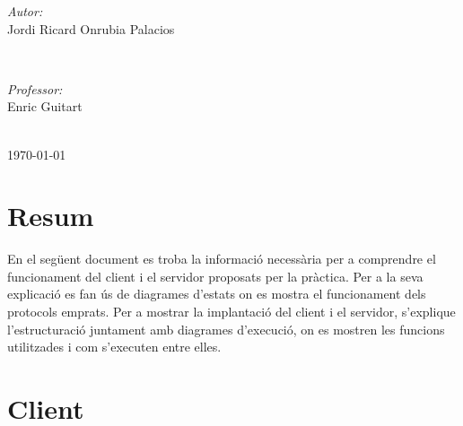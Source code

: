 \documentclass[11pt]{article}
\begin{document}
\begin{titlepage}
\begin{minipage}{0.4\textwidth}
\begin{flushleft} \large
\emph{Autor:}\\
Jordi Ricard Onrubia Palacios %
\end{flushleft}
\end{minipage}
~
\begin{minipage}{0.4\textwidth}
\begin{flushright} \large
\emph{Professor:} \\
Enric Guitart %
\end{flushright}
\end{minipage}\\[4cm]

{\large \today}\\[3cm] %
\vfill %
\end{titlepage}

\newpage
\section*{Resum}
En el següent document es troba la informació necessària per a comprendre el funcionament del client i el servidor proposats per la pràctica. Per a la seva explicació es fan ús de diagrames d'estats on es mostra el funcionament dels protocols emprats. Per a mostrar la implantació del client i el servidor, s'explique l'estructuració juntament amb diagrames d'execució, on es mostren les funcions utilitzades i com s'executen entre elles.
\justify
\thispagestyle{empty}
\newpage
\thispagestyle{empty}
\tableofcontents
\newpage
\clearpage
{}
\section{Client}
\end{document}
